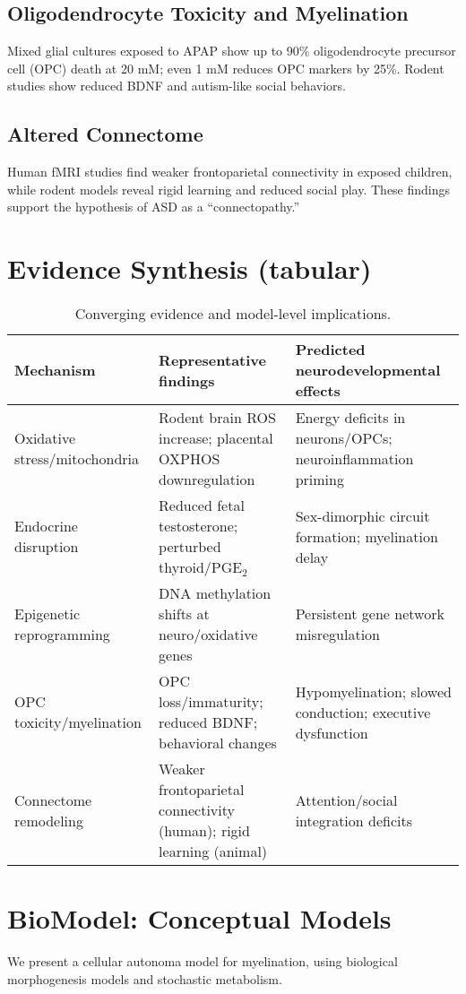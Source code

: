 \documentclass[12pt]{article}
\begin{document}
\subsection{Oligodendrocyte Toxicity and Myelination}
Mixed glial cultures exposed to APAP show up to 90\% oligodendrocyte precursor cell (OPC) death at 20 mM; even 1 mM reduces OPC markers by 25\%. Rodent studies show reduced BDNF and autism-like social behaviors.

\subsection{Altered Connectome}
Human fMRI studies find weaker frontoparietal connectivity in exposed children, while rodent models reveal rigid learning and reduced social play. These findings support the hypothesis of ASD as a ``connectopathy.''

\section{Evidence Synthesis (tabular)}
\begin{table}[h]
  \centering
  \small
  \begin{tabular}{@{}p{3.2cm} p{6.6cm} p{5.2cm}@{}}
  \toprule
  Mechanism & Representative findings & Predicted neurodevelopmental effects \\
  \midrule
  Oxidative stress/mitochondria & Rodent brain ROS increase; placental OXPHOS downregulation & Energy deficits in neurons/OPCs; neuroinflammation priming \\
  Endocrine disruption & Reduced fetal testosterone; perturbed thyroid/PGE$_2$ & Sex-dimorphic circuit formation; myelination delay \\
  Epigenetic reprogramming & DNA methylation shifts at neuro/oxidative genes & Persistent gene network misregulation \\
  OPC toxicity/myelination & OPC loss/immaturity; reduced BDNF; behavioral changes & Hypomyelination; slowed conduction; executive dysfunction \\
  Connectome remodeling & Weaker frontoparietal connectivity (human); rigid learning (animal) & Attention/social integration deficits \\
  \bottomrule
  \end{tabular}
  \caption{Converging evidence and model-level implications.}
\end{table}


\section{BioModel: Conceptual Models}
We present a cellular autonoma model for myelination, using biological morphogenesis models and stochastic metabolism.  
\end{document}
